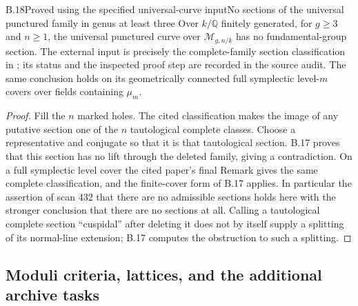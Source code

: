 \begin{statement}{B.18}{Proved using the specified universal-curve input}{No sections of the universal punctured family in genus at least three}
Over $k/\mathbb Q$ finitely generated, for $g\geq3$ and $n\geq1$,
the universal punctured curve over $\mathcal M_{g,n/k}$ has no
fundamental-group section.  The external input is precisely the
complete-family section classification in
\cite[Main theorem]{B_LuoWatanabe}; its status and the inspected
proof step are recorded in the source audit.  The same conclusion
holds on its geometrically connected full symplectic level-$m$
covers over fields containing $\mu_m$.
\end{statement}
\begin{proof}
Fill the $n$ marked holes.  The cited classification makes the image
of any putative section one of the $n$ tautological complete classes.
Choose a representative and conjugate so that it is that tautological
section.  B.17 proves that this section has no lift through the
deleted family, giving a contradiction.  On a full symplectic
level cover the cited paper's final Remark gives the same complete
classification, and the finite-cover form of B.17 applies.
In particular the assertion
of scan 432 that there are no admissible sections holds here with
the stronger conclusion that there are no sections at all.
Calling a tautological complete section ``cuspidal'' after deleting
it does not by itself supply a splitting of its normal-line
extension; B.17 computes the obstruction to such a splitting.
\end{proof}

\subsection{Moduli criteria, lattices, and the additional archive tasks}

